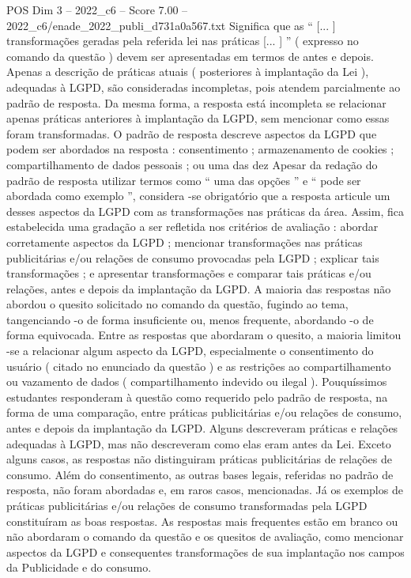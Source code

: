 \begin{textsample}{POS Dim 3 – 2022\_c6 – Score 7.00 – 2022\_c6/enade\_2022\_publi\_d731a0a567.txt}
Significa que as “ [... ] transformações geradas pela referida lei nas práticas [... ] ” ( expresso no comando da questão ) devem ser apresentadas em termos de antes e depois.
Apenas a descrição de práticas atuais ( posteriores à implantação da Lei ), adequadas à LGPD, são consideradas incompletas, pois atendem parcialmente ao padrão de resposta.
Da mesma forma, a resposta está incompleta se relacionar apenas práticas anteriores à implantação da LGPD, sem mencionar como essas foram transformadas.
O padrão de resposta descreve aspectos da LGPD que podem ser abordados na resposta : consentimento ; armazenamento de cookies ; compartilhamento de dados pessoais ; ou uma das dez Apesar da redação do padrão de resposta utilizar termos como “ uma das opções ” e “ pode ser abordada como exemplo ”, considera -se obrigatório que a resposta articule um desses aspectos da LGPD com as transformações nas práticas da área.
Assim, fica estabelecida uma gradação a ser refletida nos critérios de avaliação : abordar corretamente aspectos da LGPD ; mencionar transformações nas práticas publicitárias e/ou relações de consumo provocadas pela LGPD ; explicar tais transformações ; e apresentar transformações e comparar tais práticas e/ou relações, antes e depois da implantação da LGPD.
A maioria das respostas não abordou o quesito solicitado no comando da questão, fugindo ao tema, tangenciando -o de forma insuficiente ou, menos frequente, abordando -o de forma equivocada.
Entre as respostas que abordaram o quesito, a maioria limitou -se a relacionar algum aspecto da LGPD, especialmente o consentimento do usuário ( citado no enunciado da questão ) e as restrições ao compartilhamento ou vazamento de dados ( compartilhamento indevido ou ilegal ).
Pouquíssimos estudantes responderam à questão como requerido pelo padrão de resposta, na forma de uma comparação, entre práticas publicitárias e/ou relações de consumo, antes e depois da implantação da LGPD.
Alguns descreveram práticas e relações adequadas à LGPD, mas não descreveram como elas eram antes da Lei.
Exceto alguns casos, as respostas não distinguiram práticas publicitárias de relações de consumo.
Além do consentimento, as outras bases legais, referidas no padrão de resposta, não foram abordadas e, em raros casos, mencionadas.
Já os exemplos de práticas publicitárias e/ou relações de consumo transformadas pela LGPD constituíram as boas respostas.
As respostas mais frequentes estão em branco ou não abordaram o comando da questão e os quesitos de avaliação, como mencionar aspectos da LGPD e consequentes transformações de sua implantação nos campos da Publicidade e do consumo.

\end{textsample}
